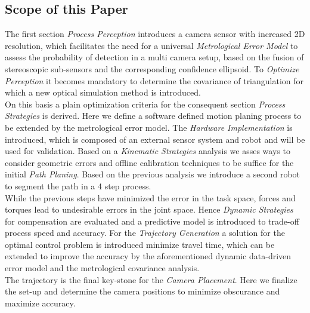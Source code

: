 \documentclass[5p,times,procedia]{elsarticle}
\begin{document}
\subsection{Scope of this Paper}
The first section \textit{Process Perception} introduces a camera sensor with increased 2D resolution, which facilitates the need for a universal \textit{Metrological Error Model} to assess the probability of detection in a multi camera setup, based on the fusion of stereoscopic sub-sensors and the corresponding confidence ellipsoid. To \textit{Optimize Perception} it becomes mandatory to determine the covariance of triangulation for which a new optical simulation method is introduced.\\
On this basis a plain optimization criteria for the consequent section \textit{Process Strategies} is derived. Here we define a software defined motion planing process to be extended by the metrological error model. The \textit{Hardware Implementation}  is introduced, which is composed of an external sensor system and robot and will be used for validation. Based on a \textit{Kinematic Strategies} analysis we asses ways to consider geometric errors and offline calibration techniques to be suffice for the initial \textit{Path Planing}. Based on the previous analysis we introduce a second robot to segment the path in a 4 step process.\\
While the previous steps have minimized the error in the task space, forces and torques lead to undesirable errors in the joint space.
Hence \textit{Dynamic Strategies} for compensation are evaluated and a predictive model is introduced to trade-off process speed and accuracy. For the \textit{Trajectory Generation} a solution for the optimal control problem is introduced minimize travel time, which can be extended to improve the accuracy by the aforementioned dynamic data-driven error model and the metrological covariance analysis.\\
The trajectory is the final key-stone for the \textit{Camera Placement}. Here we finalize the set-up and determine the camera positions
to minimize obscurance and maximize accuracy.
%
\end{document}
